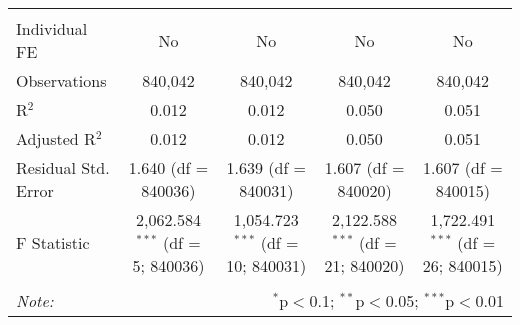 \documentclass[
]{article}
\begin{document}
\begin{table}[!htbp]
{\begin{tabular}{@{\extracolsep{5pt}}lcccc}
\hline \\[-1.8ex] 
Individual FE & No & No & No & No \\ 
Observations & 840,042 & 840,042 & 840,042 & 840,042 \\ 
R$^{2}$ & 0.012 & 0.012 & 0.050 & 0.051 \\ 
Adjusted R$^{2}$ & 0.012 & 0.012 & 0.050 & 0.051 \\ 
Residual Std. Error & 1.640 (df = 840036) & 1.639 (df = 840031) & 1.607 (df = 840020) & 1.607 (df = 840015) \\ 
F Statistic & 2,062.584$^{***}$ (df = 5; 840036) & 1,054.723$^{***}$ (df = 10; 840031) & 2,122.588$^{***}$ (df = 21; 840020) & 1,722.491$^{***}$ (df = 26; 840015) \\ 
\hline 
\hline \\[-1.8ex] 
\textit{Note:}  & \multicolumn{4}{r}{$^{*}$p$<$0.1; $^{**}$p$<$0.05; $^{***}$p$<$0.01} \\ 
\end{tabular}
} 
\end{table} 
\newpage
\end{document}
